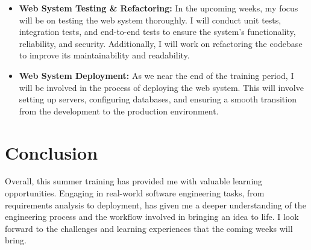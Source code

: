 \documentclass{article}
\begin{document}
\begin{itemize}
    \item \textbf{Web System Testing \& Refactoring:} In the upcoming weeks, my focus will be on testing the web system thoroughly. I will conduct unit tests, integration tests, and end-to-end tests to ensure the system's functionality, reliability, and security. Additionally, I will work on refactoring the codebase to improve its maintainability and readability.
    
    \item \textbf{Web System Deployment:} As we near the end of the training period, I will be involved in the process of deploying the web system. This will involve setting up servers, configuring databases, and ensuring a smooth transition from the development to the production environment.
    
\end{itemize}

\section{Conclusion}
Overall, this summer training has provided me with valuable learning opportunities. Engaging in real-world software engineering tasks, from requirements analysis to deployment, has given me a deeper understanding of the engineering process and the workflow involved in bringing an idea to life. I look forward to the challenges and learning experiences that the coming weeks will bring.
\end{document}
